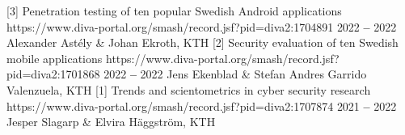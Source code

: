         \titleLinkYearRolePlace
            {[3] Penetration testing of ten popular Swedish Android applications}
            {https://www.diva-portal.org/smash/record.jsf?pid=diva2:1704891}
            {2022 \textbf{--} 2022}
            {Alexander Astély \& Johan Ekroth, KTH}
            {}
        \titleLinkYearRolePlace
            {[2] Security evaluation of ten Swedish mobile applications}
            {https://www.diva-portal.org/smash/record.jsf?pid=diva2:1701868}
            {2022 \textbf{--} 2022}
            {Jens Ekenblad \& Stefan Andres Garrido Valenzuela, KTH}
            {}
        \titleLinkYearRolePlace
            {[1] Trends and scientometrics in cyber security research}
            {https://www.diva-portal.org/smash/record.jsf?pid=diva2:1707874}
            {2021 \textbf{--} 2022}
            {Jesper Slagarp \& Elvira Häggström, KTH}
            {}
    
    \itemizeCVEnd
    